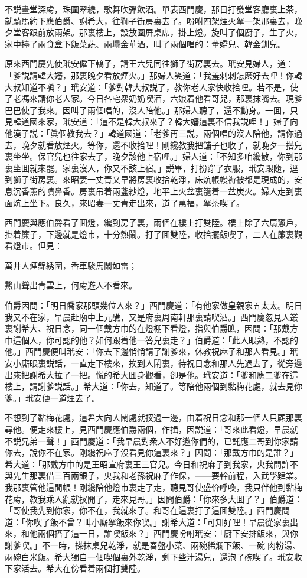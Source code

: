 不説畫堂深䖏，珠圍翠繞，歌舞吹彈飲酒。單表西門慶，那日打發堂客廳裏上茶，就騎馬約下應伯爵、謝希大，往獅子街房裏去了。吩咐四架煙火拏一架那裏去，晚夕堂客跟前放兩架。那裏樓上，設放圍屏桌席，掛上燈。旋叫了個廚子，生了火，家中擡了兩食盒下飯菜蔬、兩壜金華酒，叫了兩個唱的：董嬌兒、韓金釧兒。

原來西門慶先使玳安僱下轎子，請王六兒同往獅子街房裏去。玳安見婦人，道：「爹説請韓大嬸，那裏晚夕看放煙火。」那婦人笑道：「我羞剌剌怎麽好去哩！你韓大叔知道不嗔？」玳安道：「爹對韓大叔説了，教你老人家快收拾哩。若不是，使了老馮來請你老人家。今日各宅衆奶奶喫酒，六娘着他看哥兒，那裏抹嘴去。現爹巴巴使了我來。因叫了兩個唱的，沒人陪他。」那婦人聽了，還不動身。一囬，只見韓道國來家，玳安道：「這不是韓大叔來了？韓大嬸這裏不信我説哩！」婦子向他漢子説：「眞個教我去？」韓道國道：「老爹再三説，兩個唱的沒人陪他，請你過去，晚夕就看放煙火。等你，還不收拾哩！剛纔教我把舖子也收了，就晚夕一搭兒裏坐坐。保官兒也往家去了，晚夕該他上宿哩。」婦人道：「不知多咱纔散，你到那裏坐囬就來罷。家裏沒人，你又不該上宿。」説畢，打扮穿了衣服，玳安跟隨，逕到獅子街房裏。來昭妻一丈青又早將房裏收拾乾淨，床炕帳幔褥被都是現成的，安息沉香薰的噴鼻香。房裏吊着兩盞紗燈，地平上火盆裏籠着一盆炭火。婦人走到裏面炕上坐下。良久，來昭妻一丈青走出來，道了萬福，拏茶喫了。

西門慶與應伯爵看了囬燈，纔到房子裏，兩個在樓上打雙陸。樓上除了六扇窻戶，掛着簾子，下邊就是燈市，十分熱鬧。打了囬雙陸，收拾擺飯喫了，二人在簾裏觀看燈市。但見：
\begin{myquote}
萬井人煙錦綉圍，香車駿馬鬧如雷；

鰲山聳出青雲上，何䖏遊人不看來。
\end{myquote}

伯爵因問：「明日喬家那頭幾位人來？」西門慶道：「有他家做皇親家五太太。明日我又不在家，早晨赶廟中上元醮，又是府裏周南軒那裏請喫酒。」西門慶忽見人叢裏謝希大、祝日念，同一個戴方巾的在燈棚下看燈，指與伯爵瞧，因問：「那戴方巾這個人，你可認的他？如何跟着他一答兒裏走？」伯爵道：「此人眼熟，不認的他。」西門慶便叫玳安：「你去下邊悄悄請了謝爹來，休教祝麻子和那人看見。」玳安小廝眼裏説話，一直走下樓來，挨到人鬧裏，待祝日念和那人先過去了，從旁邊出來把謝希大拉了一把。慌的希大囬身觀看，卻是他。玳安道：「爹和應二爹在這樓上，請謝爹説話。」希大道：「你去，知道了。等陪他兩個到黏梅花處，就去見你爹。」玳安便一道煙去了。

不想到了黏梅花處，這希大向人鬧處就扠過一邊，由着祝日念和那一個人只顧那裏尋他。便走來樓上，見西門慶應伯爵兩個，作揖，因説道：「哥來此看燈，早晨就不説兄弟一聲！」西門慶道：「我早晨對衆人不好邀你們的，已託應二哥到你家請你去，說你不在家。剛纔祝麻子沒看見你這裏來？」因問：「那戴方巾的是誰？」希大道：「那戴方巾的是王昭宣府裏王三官兒。今日和祝麻子到我家，央我問許不與先生那裏借三百兩銀子，央我和老孫祝麻子作保，——要幹前程，入武學肄業。我那裏管他這閒帳！剛纔陪他燈市裏走了走，聽見哥使盛价呼喚，我只伴他到黏梅花䖏，教我乘人亂就扠開了，走來見哥。」因問伯爵：「你來多大囬了？」伯爵道：「哥使我先到你家，你不在，我就來了。和哥在這裏打了這囬雙陸。」西門慶問道：「你喫了飯不曾？叫小廝拏飯來你喫。」謝希大道：「可知好哩！早晨從家裏出來，和他兩個搭了這一日，誰喫飯來？」西門慶吩咐玳安：「廚下安排飯來，與你謝爹喫。」不一時，搽抹桌兒乾淨，就是春盤小菜、兩碗稀爛下飯、一碗𤆑肉粉湯、兩碗白米飯。希大獨自一個喫個裏外乾淨，剩下些汁湯兒，還泡了碗喫了。玳安收下家活去。希大在傍看着兩個打雙陸。

